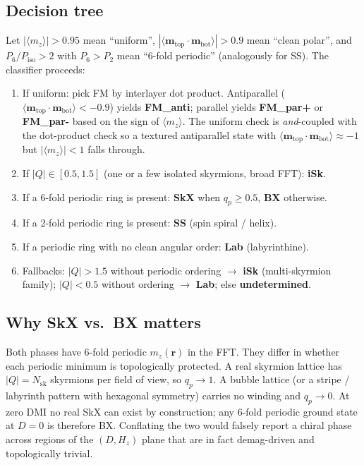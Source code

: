 \documentclass[11pt,a4paper]{article}
\newcommand{\mb}[1]{\mathbf{#1}}
\begin{document}
\subsection{Decision tree}

Let $|\langle m_z \rangle| > 0.95$ mean ``uniform'',
$|\langle \mb{m}_{\text{top}} \cdot \mb{m}_{\text{bot}}
\rangle| > 0.9$ mean ``clean polar'', and
$P_6 / P_{\text{iso}} > 2$ with
$P_6 > P_2$ mean ``6-fold periodic'' (analogously for SS).
The classifier proceeds:
%
\begin{enumerate}[nosep]
\item If uniform: pick FM by interlayer dot product.
    Antiparallel ($\langle \mb{m}_{\text{top}} \cdot
    \mb{m}_{\text{bot}} \rangle < -0.9$) yields
    \textbf{FM\_anti}; parallel yields
    \textbf{FM\_par+} or \textbf{FM\_par-} based on the
    sign of $\langle m_z \rangle$. The uniform check is
    \emph{and}-coupled with the dot-product check so a
    textured antiparallel state with $\langle
    \mb{m}_{\text{top}} \cdot \mb{m}_{\text{bot}}
    \rangle \approx -1$ but
    $|\langle m_z \rangle| < 1$ falls through.
\item If $|Q| \in [0.5, 1.5]$ (one or a few isolated
    skyrmions, broad FFT): \textbf{iSk}.
\item If a 6-fold periodic ring is present:
    \textbf{SkX} when $q_p \ge 0.5$,
    \textbf{BX} otherwise.
\item If a 2-fold periodic ring is present:
    \textbf{SS} (spin spiral / helix).
\item If a periodic ring with no clean angular order:
    \textbf{Lab} (labyrinthine).
\item Fallbacks: $|Q| > 1.5$ without periodic ordering
    $\to$ \textbf{iSk} (multi-skyrmion family);
    $|Q| < 0.5$ without ordering $\to$ \textbf{Lab};
    else \textbf{undetermined}.
\end{enumerate}

\subsection{Why SkX vs.\ BX matters}

Both phases have 6-fold periodic $m_z(\mb{r})$ in the
FFT. They differ in whether each periodic minimum is
topologically protected. A real skyrmion lattice has
$|Q| = N_{\text{sk}}$ skyrmions per field of view, so
$q_p \to 1$. A bubble lattice (or a stripe / labyrinth
pattern with hexagonal symmetry) carries no winding and
$q_p \to 0$. At zero DMI no real SkX can exist by
construction; any 6-fold periodic ground state at
$D = 0$ is therefore BX. Conflating the two would
falsely report a chiral phase across regions of the
$(D, H_z)$ plane that are in fact demag-driven and
topologically trivial.
\end{document}
